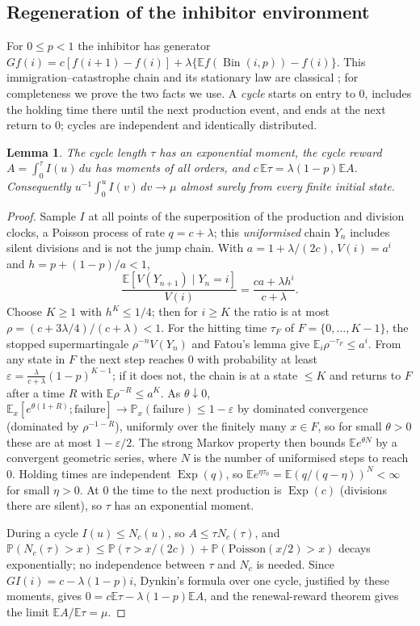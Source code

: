 \documentclass[11pt,a4paper]{article}
\numberwithin{equation}{section}
\newtheorem{lemma}[theorem]{Lemma}
\theoremstyle{definition}\newtheorem{definition}[theorem]{Definition}
\theoremstyle{remark}\newtheorem{remark}[theorem]{Remark}\newtheorem{example}[theorem]{Example}
\newcommand{\E}{\mathbb E}
\renewcommand{\P}{\mathbb P}
\newcommand{\Bin}{\operatorname{Bin}}
\newcommand{\Exp}{\operatorname{Exp}}
\begin{document}
\subsection{Regeneration of the inhibitor environment}\label{sec:regen}
For $0\le p<1$ the inhibitor has generator $Gf(i)=c[f(i+1)-f(i)]+\lambda\{\E f(\Bin(i,p))-f(i)\}$. This immigration--catastrophe chain and its stationary law are classical \cite{BrockwellGaniResnick1982,Economou2004,BenAriRoitershteinSchinazi2019}; for completeness we prove the two facts we use. A \emph{cycle} starts on entry to $0$, includes the holding time there until the next production event, and ends at the next return to $0$; cycles are independent and identically distributed.

\begin{lemma}\label{lem:cycles}
The cycle length $\tau$ has an exponential moment, the cycle reward $A=\int_0^\tau I(u)\,du$ has moments of all orders, and $c\,\E\tau=\lambda(1-p)\E A$. Consequently $u^{-1}\int_0^uI(v)\,dv\to\mu$ almost surely from every finite initial state.
\end{lemma}

\begin{proof}
Sample $I$ at all points of the superposition of the production and division clocks, a Poisson process of rate $q=c+\lambda$; this \emph{uniformised} chain $Y_n$ includes silent divisions and is not the jump chain. With $a=1+\lambda/(2c)$, $V(i)=a^i$ and $h=p+(1-p)/a<1$,
\[
\frac{\E[V(Y_{n+1})\mid Y_n=i]}{V(i)}=\frac{ca+\lambda h^i}{c+\lambda}.
\]
Choose $K\ge1$ with $h^K\le1/4$; then for $i\ge K$ the ratio is at most $\rho=(c+3\lambda/4)/(c+\lambda)<1$. For the hitting time $\tau_F$ of $F=\{0,\dots,K-1\}$, the stopped supermartingale $\rho^{-n}V(Y_n)$ and Fatou's lemma give $\E_i\rho^{-\tau_F}\le a^i$. From any state in $F$ the next step reaches $0$ with probability at least $\varepsilon=\frac{\lambda}{c+\lambda}(1-p)^{K-1}$; if it does not, the chain is at a state $\le K$ and returns to $F$ after a time $R$ with $\E\rho^{-R}\le a^K$. As $\theta\downarrow0$, $\E_x[e^{\theta(1+R)};\text{failure}]\to\P_x(\text{failure})\le1-\varepsilon$ by dominated convergence (dominated by $\rho^{-1-R}$), uniformly over the finitely many $x\in F$, so for small $\theta>0$ these are at most $1-\varepsilon/2$. The strong Markov property then bounds $\E e^{\theta N}$ by a convergent geometric series, where $N$ is the number of uniformised steps to reach $0$. Holding times are independent $\Exp(q)$, so $\E e^{\eta\tau_0}=\E(q/(q-\eta))^N<\infty$ for small $\eta>0$. At $0$ the time to the next production is $\Exp(c)$ (divisions there are silent), so $\tau$ has an exponential moment.

During a cycle $I(u)\le N_c(u)$, so $A\le\tau N_c(\tau)$, and $\P(N_c(\tau)>x)\le\P(\tau>x/(2c))+\P(\mathrm{Poisson}(x/2)>x)$ decays exponentially; no independence between $\tau$ and $N_c$ is needed. Since $GI(i)=c-\lambda(1-p)i$, Dynkin's formula over one cycle, justified by these moments, gives $0=c\E\tau-\lambda(1-p)\E A$, and the renewal-reward theorem gives the limit $\E A/\E\tau=\mu$.
\end{proof}
\end{document}
